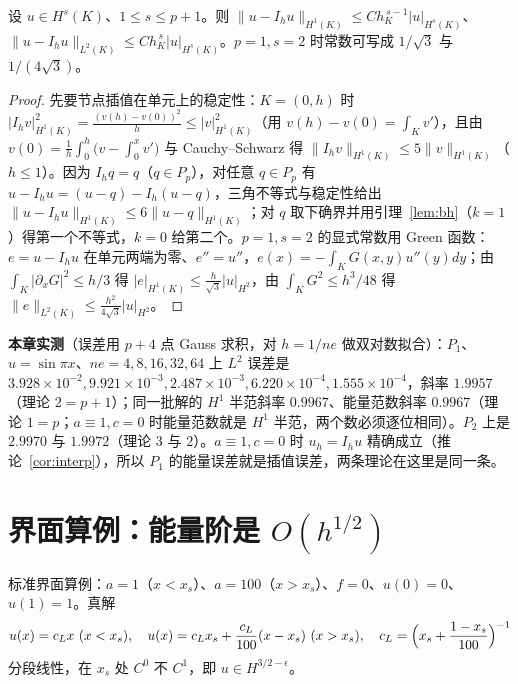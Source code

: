 \begin{theorem}[插值误差估计]
\label{thm:interp}
设 $u\in H^s(K)$、$1\le s\le p+1$。则 $\|u-I_hu\|_{H^1(K)}\le
Ch_K^{\,s-1}|u|_{H^s(K)}$、$\|u-I_hu\|_{L^2(K)}\le Ch_K^{\,s}|u|_{H^s(K)}$。$p=1,s=2$ 时常数可写成
$1/\sqrt3$ 与 $1/(4\sqrt3)$。
\end{theorem}
\begin{proof}
先要节点插值在单元上的稳定性：$K=(0,h)$ 时 $|I_hv|_{H^1(K)}^2=\frac{(v(h)-v(0))^2}{h}\le|v|_{H^1(K)}^2$（用
$v(h)-v(0)=\int_Kv'$），且由 $v(0)=\frac1h\int_0^h\bigl(v-\int_0^xv'\bigr)$ 与 Cauchy--Schwarz 得
$\|I_hv\|_{H^1(K)}\le5\|v\|_{H^1(K)}$（$h\le1$）。因为 $I_hq=q$（$q\in P_p$），对任意 $q\in P_p$ 有
$u-I_hu=(u-q)-I_h(u-q)$，三角不等式与稳定性给出 $\|u-I_hu\|_{H^1(K)}\le6\|u-q\|_{H^1(K)}$；对 $q$
取下确界并用引理~\ref{lem:bh}（$k=1$）得第一个不等式，$k=0$ 给第二个。$p=1,s=2$ 的显式常数用 Green 函数：$e=u-I_hu$
在单元两端为零、$e''=u''$，$e(x)=-\int_KG(x,y)u''(y)dy$；由 $\int_K|\partial_xG|^2\le h/3$ 得
$|e|_{H^1(K)}\le\frac{h}{\sqrt3}|u|_{H^2}$，由 $\int_KG^2\le h^3/48$ 得
$\|e\|_{L^2(K)}\le\frac{h^2}{4\sqrt3}|u|_{H^2}$。
\end{proof}

\textbf{本章实测}（误差用 $p+4$ 点 Gauss 求积，对 $h=1/ne$ 做双对数拟合）：$P_1$、$u=\sin\pi x$、$ne=4,8,16,32,64$ 上
$L^2$ 误差是
$3.928\times10^{-2},9.921\times10^{-3},2.487\times10^{-3},6.220\times10^{-4},1.555\times10^{-4}$，斜率
$1.9957$（理论 $2=p+1$）；同一批解的 $H^1$ 半范斜率 $0.9967$、能量范数斜率 $0.9967$（理论 $1=p$；$a\equiv1,c=0$ 时能量范数就是 $H^1$ 半范，两个数必须逐位相同）。$P_2$ 上是 $2.9970$ 与
$1.9972$（理论 $3$ 与 $2$）。$a\equiv1,c=0$ 时 $u_h=I_hu$ 精确成立（推论~\ref{cor:interp}），所以 $P_1$
的能量误差就是插值误差，两条理论在这里是同一条。

\section{界面算例：能量阶是 $O(h^{1/2})$}

标准界面算例：$a=1$（$x<x_s$）、$a=100$（$x>x_s$）、$f=0$、$u(0)=0$、$u(1)=1$。真解
\begin{equation}
  u(x)=c_Lx\ (x<x_s),\quad u(x)=c_Lx_s+\frac{c_L}{100}(x-x_s)\ (x>x_s),\quad
  c_L=\Bigl(x_s+\frac{1-x_s}{100}\Bigr)^{-1}
  \label{eq:iface-exact}
\end{equation}
分段线性，在 $x_s$ 处 $C^0$ 不 $C^1$，即 $u\in H^{3/2-\epsilon}$。

